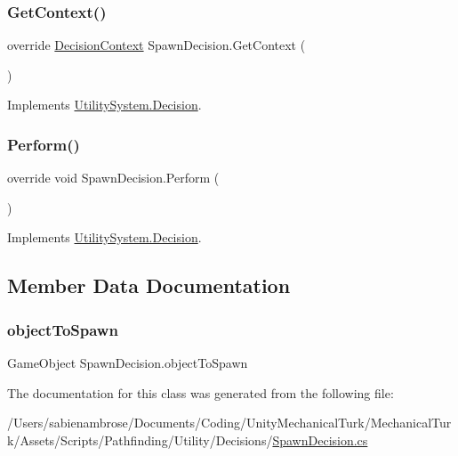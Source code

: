 \subsubsection{\texorpdfstring{Get\+Context()}{GetContext()}}
{\footnotesize\ttfamily override \mbox{\hyperlink{class_utility_system_1_1_decision_context}{Decision\+Context}} Spawn\+Decision.\+Get\+Context (\begin{DoxyParamCaption}{ }\end{DoxyParamCaption})\hspace{0.3cm}{\ttfamily [virtual]}}



Implements \mbox{\hyperlink{class_utility_system_1_1_decision_a46ba8cac39f52c630897a24f2bde6b07}{Utility\+System.\+Decision}}.

\mbox{\label{class_spawn_decision_a7f943d8fd313e6a38f26b223e4b4dba7}} 
\subsubsection{\texorpdfstring{Perform()}{Perform()}}
{\footnotesize\ttfamily override void Spawn\+Decision.\+Perform (\begin{DoxyParamCaption}{ }\end{DoxyParamCaption})\hspace{0.3cm}{\ttfamily [virtual]}}



Implements \mbox{\hyperlink{class_utility_system_1_1_decision_a055dcaafb617365bc8b16bb9acba6575}{Utility\+System.\+Decision}}.



\subsection{Member Data Documentation}
\mbox{\label{class_spawn_decision_af271fdcf4d0d835a2c4eaf7c9263433d}} 
\subsubsection{\texorpdfstring{object\+To\+Spawn}{objectToSpawn}}
{\footnotesize\ttfamily Game\+Object Spawn\+Decision.\+object\+To\+Spawn}



The documentation for this class was generated from the following file\+:\begin{DoxyCompactItemize}
\item 
/\+Users/sabienambrose/\+Documents/\+Coding/\+Unity\+Mechanical\+Turk/\+Mechanical\+Turk/\+Assets/\+Scripts/\+Pathfinding/\+Utility/\+Decisions/\mbox{\hyperlink{_spawn_decision_8cs}{Spawn\+Decision.\+cs}}\end{DoxyCompactItemize}
